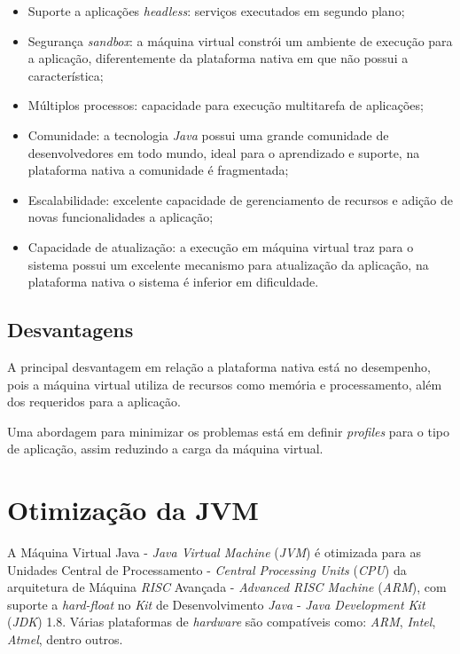 \begin{itemize}

    \item Suporte a aplicações \textit{headless}: serviços executados em
    segundo plano;

    \item Segurança \textit{sandbox}: a máquina virtual constrói um ambiente de
    execução para a aplicação, diferentemente da plataforma nativa em que não
    possui a característica;

    \item Múltiplos processos: capacidade para execução multitarefa de
    aplicações;

    \item Comunidade: a tecnologia \textit{Java} possui uma grande comunidade
    de desenvolvedores em todo mundo, ideal para o aprendizado e suporte, na
    plataforma nativa a comunidade é fragmentada;

    \item Escalabilidade: excelente capacidade de gerenciamento de recursos e
    adição de novas funcionalidades a aplicação;

    \item Capacidade de atualização: a execução em máquina virtual traz para o
    sistema possui um excelente mecanismo para atualização da aplicação, na
    plataforma nativa o sistema é inferior em dificuldade.

\end{itemize}

\subsection{Desvantagens}

A principal desvantagem em relação a plataforma nativa está no desempenho, pois
a máquina virtual utiliza de recursos como memória e processamento, além dos
requeridos para a aplicação.

Uma abordagem para minimizar os problemas está em definir \textit{profiles}
para o tipo de aplicação, assim reduzindo a carga da máquina virtual.

\section{Otimização da JVM}

A Máquina Virtual Java - \textit{Java Virtual Machine} (\textit{JVM}) é
otimizada para as Unidades Central de Processamento - \textit{Central
  Processing Units} (\textit{CPU}) da arquitetura de Máquina \textit{RISC} 
  Avançada - \textit{Advanced RISC Machine} (\textit{ARM}), com suporte a
\textit{hard-float} no \textit{Kit} de Desenvolvimento \textit{Java} -
\textit{Java Development Kit} (\textit{JDK}) 1.8. Várias plataformas de
\textit{hardware} são compatíveis como: \textit{ARM}, \textit{Intel},
\textit{Atmel}, dentro outros.
